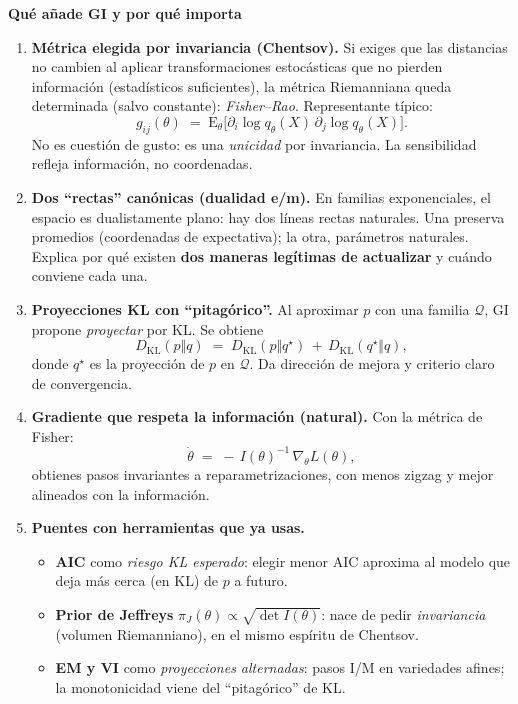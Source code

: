 \documentclass[12pt,letterpaper]{book}
\begin{document}
\textbf{Qué añade GI y por qué importa}

\begin{enumerate}
	\item \textbf{Métrica elegida por invariancia (Chentsov).} Si exiges que las distancias no cambien al aplicar transformaciones estocásticas que no pierden información (estadísticos suficientes), la métrica Riemanniana queda determinada (salvo constante): \emph{Fisher--Rao}. Representante típico:
	\[
	g_{ij}(\theta)\;=\;\mathrm{E}_{\theta}\!\big[\partial_i \log q_\theta(X)\,\partial_j \log q_\theta(X)\big].
	\]
	No es cuestión de gusto: es una \emph{unicidad} por invariancia. La sensibilidad refleja información, no coordenadas.
	
	\item \textbf{Dos “rectas” canónicas (dualidad e/m).} En familias exponenciales, el espacio es dualistamente plano: hay dos líneas rectas naturales. Una preserva promedios (coordenadas de expectativa); la otra, parámetros naturales. Explica por qué existen \textbf{dos maneras legítimas de actualizar} y cuándo conviene cada una.
	
	\item \textbf{Proyecciones KL con “pitagórico”.} Al aproximar $p$ con una familia $\mathcal{Q}$, GI propone \emph{proyectar} por KL. Se obtiene
	\[
	D_{\mathrm{KL}}(p\Vert q)\;=\;D_{\mathrm{KL}}(p\Vert q^\star)\,+\,D_{\mathrm{KL}}(q^\star\Vert q),
	\]
	donde $q^\star$ es la proyección de $p$ en $\mathcal{Q}$. Da dirección de mejora y criterio claro de convergencia.
	
	\item \textbf{Gradiente que respeta la información (natural).} Con la métrica de Fisher:
	\[
	\dot{\theta}\;=\;-\,I(\theta)^{-1}\,\nabla_{\!\theta} L(\theta),
	\]
	obtienes pasos invariantes a reparametrizaciones, con menos zigzag y mejor alineados con la información.
	
	\item \textbf{Puentes con herramientas que ya usas.}
	\begin{itemize}
		\item \textbf{AIC} como \emph{riesgo KL esperado}: elegir menor AIC aproxima al modelo que deja más cerca (en KL) de $p$ a futuro.
		\item \textbf{Prior de Jeffreys} $\pi_J(\theta)\propto \sqrt{\det I(\theta)}$: nace de pedir \emph{invariancia} (volumen Riemanniano), en el mismo espíritu de Chentsov.
		\item \textbf{EM y VI} como \emph{proyecciones alternadas}: pasos I/M en variedades afines; la monotonicidad viene del “pitagórico” de KL.
	\end{itemize}
\end{enumerate}
\end{document}
